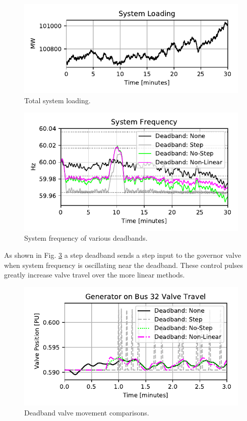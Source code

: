 \begin{figure}[!ht]
\centering
\includegraphics[width=\linewidth]{figures/miniWECCuniAccPload}
\caption{Total system loading.}
\label{fig: systemLoading}
\end{figure}

\begin{figure}[!ht]
\centering
\includegraphics[width=\linewidth]{figures/miniWECCnoiseNLdroopDBFreq}
\caption{System frequency of various deadbands.}
\label{fig: sysFreqDB}
\end{figure}

As shown in Fig. \ref{fig: valveComp} a step deadband sends a step input to the governor valve when system frequency is oscillating near the deadband. These control pulses greatly increase valve travel over the more linear methods.

\begin{figure}[!ht]
\centering
\includegraphics[width=\linewidth]{figures/gen32ValveComp}
\caption{Deadband valve movement comparisons.}
\label{fig: valveComp}
\end{figure}

